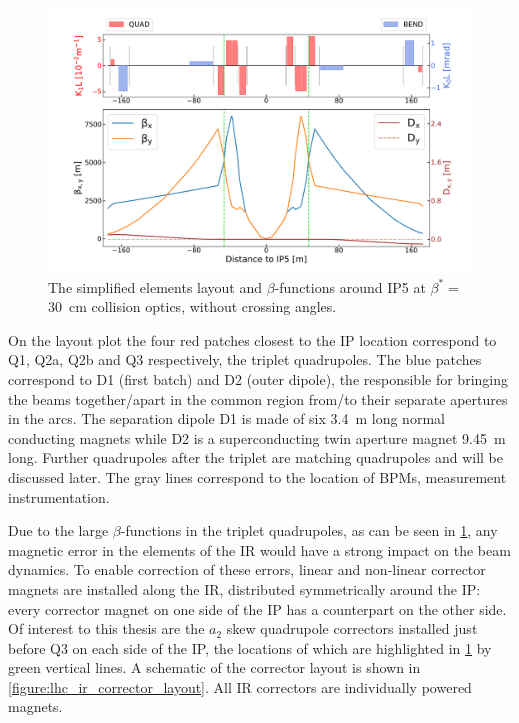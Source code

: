 \begin{figure}[!hbt]
  \centering
  \includegraphics*[width=\linewidth]{Figures/Optics_Measurements_Corrections_at_LHC/lhc_ir5_zoomed.pdf}
  \caption{The simplified elements layout and \(\beta\)-functions around IP\num{5} at \(\beta^{\ast} =\) \qty{30}{\centi\metre} collision optics, without crossing angles.}
  \label{figure:lhc_ir5_zoomed}
\end{figure}

On the layout plot the four \textcolor{latwiss_red}{red patches} closest to the \gls{IP} location correspond to Q\num{1}, Q\num{2}a, Q\num{2}b and Q\num{3} respectively, the triplet quadrupoles.
The \textcolor{latwiss_blue}{blue patches} correspond to D\num{1} (first batch) and D\num{2} (outer dipole), the  responsible for bringing the beams together/apart in the common region from/to their separate apertures in the arcs.
The separation dipole D\num{1} is made of six \qty{3.4}{\meter} long normal conducting magnets while D\num{2} is a superconducting twin aperture magnet \qty{9.45}{\meter} long.
Further quadrupoles after the triplet are matching quadrupoles and will be discussed later.
The gray lines correspond to the location of \glspl{BPM}, measurement instrumentation.

Due to the large \(\beta\)-functions in the triplet quadrupoles, as can be seen in \cref{figure:lhc_ir5_zoomed}, any magnetic error in the elements of the IR would have a strong impact on the beam dynamics.
To enable correction of these errors, linear and non-linear corrector magnets are installed along the IR, distributed symmetrically around the IP: every corrector magnet on one side of the IP has a counterpart on the other side.
Of interest to this thesis are the \(a_2\) \gls{skew} quadrupole correctors installed just before Q\num{3} on each side of the \gls{IP}, the locations of which are highlighted in \cref{figure:lhc_ir5_zoomed} by \textcolor{mqsx_green}{green vertical lines}.
A schematic of the corrector layout is shown in \cref{figure:lhc_ir_corrector_layout}.
All IR correctors are individually powered magnets.

